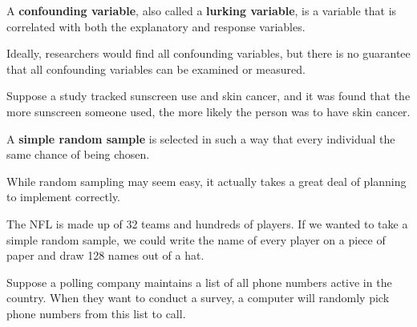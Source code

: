 \documentclass{beamer}
\begin{document}
\begin{frame}
\begin{definition}
A \textbf{confounding variable}, also called a \textbf{lurking variable}, is a variable that is correlated with both the explanatory and response variables.
\end{definition}\pause

\begin{note}
Ideally, researchers would find all confounding variables, but there is no guarantee that all confounding variables can be examined or measured.
\end{note}\pause

\begin{example}
Suppose a study tracked sunscreen use and skin cancer, and it was found that the more sunscreen someone used, the more likely the person was to have skin cancer.

\vspace{2mm}
\pause
{}
\end{example}
\end{frame}

\begin{frame}
\begin{definition}
A \textbf{simple random sample} is selected in such a way that every individual the same chance of being chosen.
\end{definition}\pause

\begin{note}
While random sampling may seem easy, it actually takes a great deal of planning to implement correctly.
\end{note}\pause

\begin{example}
The NFL is made up of 32 teams and hundreds of players. If we wanted to take a simple random sample, we could write the name of every player on a piece of paper and draw 128 names out of a hat.
\end{example}\pause

\begin{example}
Suppose a polling company maintains a list of all phone numbers active in the country. When they want to conduct a survey, a computer will randomly pick phone numbers from this list to call.
\end{example}
\end{frame}
\end{document}
